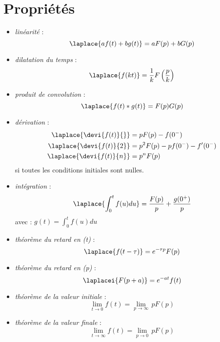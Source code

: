 \section{Propriétés} 
\begin{itemize}
    \item \emph{linéarité} :
    \[ 
        \laplace{af(t)+bg(t)} = aF(p) + bG(p)
    \]
    \item \emph{dilatation du temps} : 
    \[ 
        \laplace{f(kt)}=\dfrac{1}{k}F\left(\dfrac{p}{k}\right)
    \]
    \item \emph{produit de convolution} : 
    \[
        \laplace{f(t)*g(t)} = F(p)G(p)
    \]
    \item \emph{dérivation} : 
    \begin{align*}
        \laplace{\devi{f(t)}{}}&=pF(p) - f(0^-) \\
        \laplace{\devi{f(t)}{2}}&=p^2F(p) - pf(0^-) - f'(0^-)\\
        \laplace{\devi{f(t)}{n}}&=p^nF(p) 
    \end{align*}
    si toutes les conditions initiales sont nulles.
    \item \emph{intégration} :
    \[
        \laplace{\int_0^t f(u)du} = \dfrac{F(p)}{p} + \dfrac{g(0^+)}{p}
    \]
        avec :  $g(t)=\int_0^t f(u)du$
    \item \emph{théorème du retard en (t)} :
    \[
        \laplace{f(t-\tau)}=e^{-\tau p}F(p)
    \]
    \item \emph{théorème du retard en (p)} :
    \[
        \laplacei{F(p+a)}=e^{-at}f(t)
    \]
    \item \emph{théorème de la valeur initiale} :
    \[
        \lim\limits_{t \to 0} f(t)=\lim\limits_{p \to \infty}\, p F(p)
    \]
    \item \emph{théorème de la valeur finale} :
    \[
        \lim\limits_{t \to \infty} f(t)=\lim\limits_{p \to 0}\,p F(p)
    \]
\end{itemize}
\clearpage
